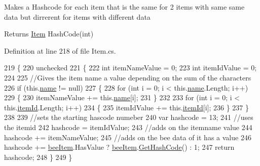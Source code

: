 Makes a Hashcode for each item that is the same for 2 items with same same data but dirrerent for items with different data 

\begin{DoxyReturn}{Returns}
\hyperlink{struct_bee_game_1_1_items_1_1_item}{Item} Hash\+Code(int)
\end{DoxyReturn}


Definition at line 218 of file Item.\+cs.


\begin{DoxyCode}
219         \{
220             unchecked
221             \{
222                 \textcolor{keywordtype}{int} itemNameValue = 0;
223                 \textcolor{keywordtype}{int} itemIdValue = 0;
224 
225                 \textcolor{comment}{//Gives the item name a value depending on the sum of the characters}
226                 \textcolor{keywordflow}{if} (this.\hyperlink{struct_bee_game_1_1_items_1_1_item_a0b0bd7eb510757f650f1be3d05b23fc8}{name} != null)
227                 \{
228                     \textcolor{keywordflow}{for} (\textcolor{keywordtype}{int} i = 0; i < this.\hyperlink{struct_bee_game_1_1_items_1_1_item_a0b0bd7eb510757f650f1be3d05b23fc8}{name}.Length; i++)
229                     \{
230                         itemNameValue += this.\hyperlink{struct_bee_game_1_1_items_1_1_item_a0b0bd7eb510757f650f1be3d05b23fc8}{name}[i];
231                     \}
232 
233                     \textcolor{keywordflow}{for} (\textcolor{keywordtype}{int} i = 0; i < this.\hyperlink{struct_bee_game_1_1_items_1_1_item_aa85bfeab893271c26f8ca41b638ada1c}{itemId}.Length; i++)
234                     \{
235                         itemIdValue += this.\hyperlink{struct_bee_game_1_1_items_1_1_item_aa85bfeab893271c26f8ca41b638ada1c}{itemId}[i];
236                     \}
237                 \}
238 
239                 \textcolor{comment}{//sets the starting hascode numeber}
240                 var hashcode = 13;
241                 \textcolor{comment}{//uses the itemid}
242                 hashcode = itemIdValue;
243                 \textcolor{comment}{//adds on the itemname value}
244                 hashcode += itemNameValue;
245                 \textcolor{comment}{//adds on the bee data of it has a value}
246                 hashcode += \hyperlink{struct_bee_game_1_1_items_1_1_item_a0593f3b7b3ff5daa864f3c6d0ccd77ca}{beeItem}.HasValue ? \hyperlink{struct_bee_game_1_1_items_1_1_item_a0593f3b7b3ff5daa864f3c6d0ccd77ca}{beeItem}.\hyperlink{struct_bee_game_1_1_bee_1_1_bee_data_ab11b7e2d244cb0021c52ae0b839ff6c3}{GetHashCode}() : 1;
247                 \textcolor{keywordflow}{return} hashcode;
248             \}
249         \}
\end{DoxyCode}
\mbox{\label{struct_bee_game_1_1_items_1_1_item_aedf7a9ae2db756f3351e5931dd0e2ee1}} 
